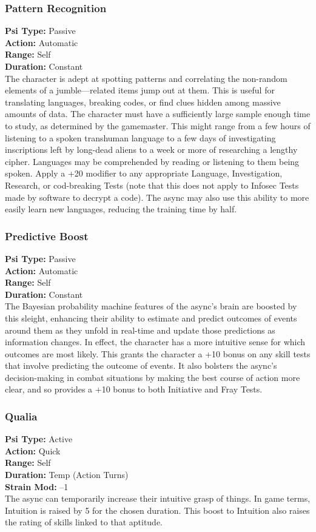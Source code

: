\subsubsection{Pattern Recognition}
\textbf{Psi Type:} Passive \\ 
\textbf{Action:} Automatic \\ 
\textbf{Range:} Self \\ 
\textbf{Duration:} Constant \\
The character is adept at spotting patterns and correlating
the non-random elements of a jumble—related
items jump out at them. This is useful for translating
languages, breaking codes, or find clues hidden among
massive amounts of data. The character must have
a sufficiently large sample enough time to study, as
determined by the gamemaster. This might range from
a few hours of listening to a spoken transhuman language
to a few days of investigating inscriptions left
by long-dead aliens to a week or more of researching
a lengthy cipher. Languages may be comprehended by
reading or listening to them being spoken. Apply a
+20 modifier to any appropriate Language, Investigation,
Research, or cod-breaking Tests (note that this
does not apply to Infosec Tests made by software to
decrypt a code). The async may also use this ability to
more easily learn new languages, reducing the training
time by half.

\subsubsection{Predictive Boost}
\textbf{Psi Type:} Passive \\ 
\textbf{Action:} Automatic \\ 
\textbf{Range:} Self \\ 
\textbf{Duration:} Constant \\
The Bayesian probability machine features of the
async’s brain are boosted by this sleight, enhancing
their ability to estimate and predict outcomes of
events around them as they unfold in real-time and
update those predictions as information changes.
In effect, the character has a more intuitive sense
for which outcomes are most likely. This grants the
character a +10 bonus on any skill tests that involve
predicting the outcome of events. It also bolsters
the async’s decision-making in combat situations by
making the best course of action more clear, and so
provides a +10 bonus to both Initiative and Fray Tests.

\subsubsection{Qualia}
\textbf{Psi Type:} Active \\ 
\textbf{Action:} Quick \\ 
\textbf{Range:} Self \\ 
\textbf{Duration:} Temp (Action Turns) \\
\textbf{Strain Mod:} –1 \\
The async can temporarily increase their intuitive
grasp of things. In game terms, Intuition is raised by
5 for the chosen duration. This boost to Intuition also
raises the rating of skills linked to that aptitude.

